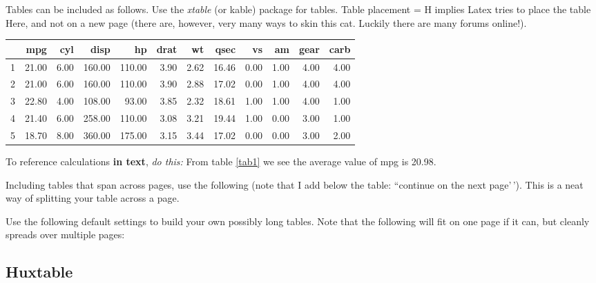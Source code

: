 \documentclass[11pt,preprint, authoryear]{elsarticle}
\let\origtable\table
\let\endorigtable\endtable
\renewenvironment{table}[1][2] {
    \expandafter\origtable\expandafter[H]
} {
    \endorigtable
}
\numberwithin{equation}{section}
\numberwithin{figure}{section}
\numberwithin{table}{section}
\begin{document}
Tables can be included as follows. Use the \emph{xtable} (or kable)
package for tables. Table placement = H implies Latex tries to place the
table Here, and not on a new page (there are, however, very many ways to
skin this cat. Luckily there are many forums online!).

\begin{table}[H]
\centering
\begin{tabular}{rrrrrrrrrrrr}
  \hline
 & mpg & cyl & disp & hp & drat & wt & qsec & vs & am & gear & carb \\ 
  \hline
1 & 21.00 & 6.00 & 160.00 & 110.00 & 3.90 & 2.62 & 16.46 & 0.00 & 1.00 & 4.00 & 4.00 \\ 
  2 & 21.00 & 6.00 & 160.00 & 110.00 & 3.90 & 2.88 & 17.02 & 0.00 & 1.00 & 4.00 & 4.00 \\ 
  3 & 22.80 & 4.00 & 108.00 & 93.00 & 3.85 & 2.32 & 18.61 & 1.00 & 1.00 & 4.00 & 1.00 \\ 
  4 & 21.40 & 6.00 & 258.00 & 110.00 & 3.08 & 3.21 & 19.44 & 1.00 & 0.00 & 3.00 & 1.00 \\ 
  5 & 18.70 & 8.00 & 360.00 & 175.00 & 3.15 & 3.44 & 17.02 & 0.00 & 0.00 & 3.00 & 2.00 \\ 
   \hline
\end{tabular}
\caption{Short Table Example \label{tab1}} 
\end{table}

To reference calculations \textbf{in text}, \emph{do this:} From table
\ref{tab1} we see the average value of mpg is 20.98.

Including tables that span across pages, use the following (note that I
add below the table: ``continue on the next page'\,'). This is a neat
way of splitting your table across a page.

Use the following default settings to build your own possibly long
tables. Note that the following will fit on one page if it can, but
cleanly spreads over multiple pages:

\hfill

\hypertarget{huxtable}{%
\subsection{Huxtable}\label{huxtable}}

 
  \providecommand{\huxb}[2]{\arrayrulecolor[RGB]{#1}\global\arrayrulewidth=#2pt}
  \providecommand{\huxvb}[2]{\color[RGB]{#1}\vrule width #2pt}
  \providecommand{\huxtpad}[1]{\rule{0pt}{#1}}
  \providecommand{\huxbpad}[1]{\rule[-#1]{0pt}{#1}}
\end{document}
